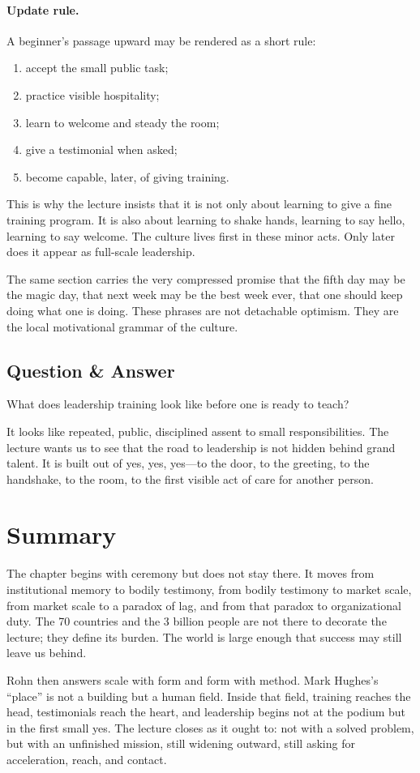 \paragraph{Update rule.}
A beginner's passage upward may be rendered as a short rule:
\begin{enumerate}
\item accept the small public task;
\item practice visible hospitality;
\item learn to welcome and steady the room;
\item give a testimonial when asked;
\item become capable, later, of giving training.
\end{enumerate}

This is why the lecture insists that it is not only about learning to give a fine training program. It is also about learning to shake hands, learning to say hello, learning to say welcome. The culture lives first in these minor acts. Only later does it appear as full-scale leadership.

The same section carries the very compressed promise that the fifth day may be the magic day, that next week may be the best week ever, that one should keep doing what one is doing. These phrases are not detachable optimism. They are the local motivational grammar of the culture.

\subsection{Question \& Answer}

What does leadership training look like before one is ready to teach?

It looks like repeated, public, disciplined assent to small responsibilities. The lecture wants us to see that the road to leadership is not hidden behind grand talent. It is built out of yes, yes, yes---to the door, to the greeting, to the handshake, to the room, to the first visible act of care for another person.

\section{Summary}

The chapter begins with ceremony but does not stay there. It moves from institutional memory to bodily testimony, from bodily testimony to market scale, from market scale to a paradox of lag, and from that paradox to organizational duty. The 70 countries and the 3 billion people are not there to decorate the lecture; they define its burden. The world is large enough that success may still leave us behind.

Rohn then answers scale with form and form with method. Mark Hughes's ``place'' is not a building but a human field. Inside that field, training reaches the head, testimonials reach the heart, and leadership begins not at the podium but in the first small yes. The lecture closes as it ought to: not with a solved problem, but with an unfinished mission, still widening outward, still asking for acceleration, reach, and contact.
